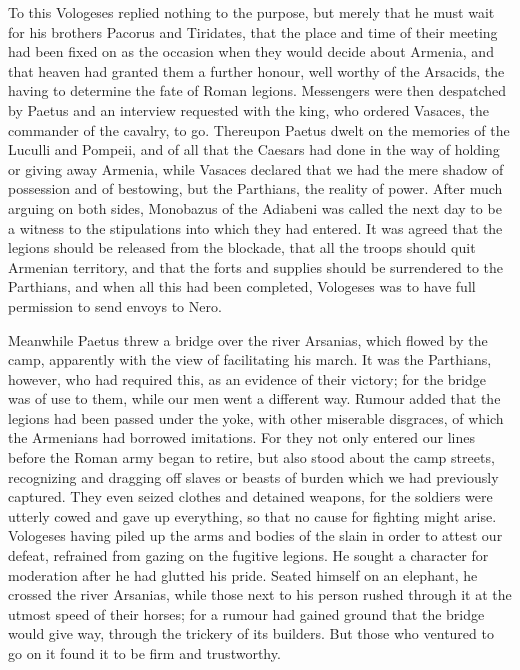 
To this Vologeses replied nothing to the purpose, but merely that he must wait for his brothers Pacorus and Tiridates, that the place and time of their meeting had been fixed on as the occasion when they would decide about Armenia, and that heaven had granted them a further honour, well worthy of the Arsacids, the having to determine the fate of Roman legions. Messengers were then despatched by Paetus and an interview requested with the king, who ordered Vasaces, the commander of the cavalry, to go. Thereupon Paetus dwelt on the memories of the Luculli and Pompeii, and of all that the Caesars had done in the way of holding or giving away Armenia, while Vasaces declared that we had the mere shadow of possession and of bestowing, but the Parthians, the reality of power. After much arguing on both sides, Monobazus of the Adiabeni was called the next day to be a witness to the stipulations into which they had entered. It was agreed that the legions should be released from the blockade, that all the troops should quit Armenian territory, and that the forts and supplies should be surrendered to the Parthians, and when all this had been completed, Vologeses was to have full permission to send envoys to Nero.


Meanwhile Paetus threw a bridge over the river Arsanias, which flowed by the camp, apparently with the view of facilitating his march. It was the Parthians, however, who had required this, as an evidence of their victory; for the bridge was of use to them, while our men went a different way. Rumour added that the legions had been passed under the yoke, with other miserable disgraces, of which the Armenians had borrowed imitations. For they not only entered our lines before the Roman army began to retire, but also stood about the camp streets, recognizing and dragging off slaves or beasts of burden which we had previously captured. They even seized clothes and detained weapons, for the soldiers were utterly cowed and gave up everything, so that no cause for fighting might arise. Vologeses having piled up the arms and bodies of the slain in order to attest our defeat, refrained from gazing on the fugitive legions. He sought a character for moderation after he had glutted his pride. Seated himself on an elephant, he crossed the river Arsanias, while those next to his person rushed through it at the utmost speed of their horses; for a rumour had gained ground that the bridge would give way, through the trickery of its builders. But those who ventured to go on it found it to be firm and trustworthy.

